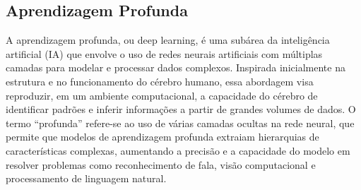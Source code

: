 










\subsection{Aprendizagem Profunda}
\label{sec:dl}

A aprendizagem profunda, ou deep learning, é uma subárea da inteligência artificial (IA) que envolve o uso de redes neurais artificiais com múltiplas camadas para modelar e processar dados complexos. Inspirada inicialmente na estrutura e no funcionamento do cérebro humano, essa abordagem visa reproduzir, em um ambiente computacional, a capacidade do cérebro de identificar padrões e inferir informações a partir de grandes volumes de dados. O termo ``profunda'' refere-se ao uso de várias camadas ocultas na rede neural, que permite que modelos de aprendizagem profunda extraiam hierarquias de características complexas, aumentando a precisão e a capacidade do modelo em resolver problemas como reconhecimento de fala, visão computacional e processamento de linguagem natural.


